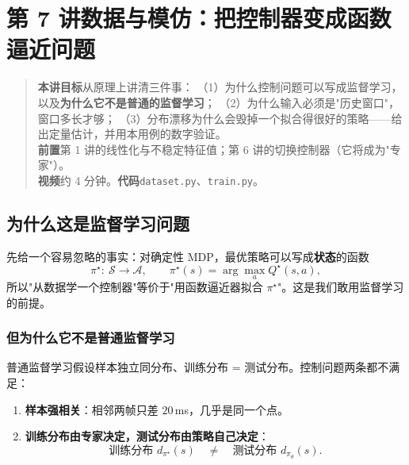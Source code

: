 \chapter[数据与模仿]{第 7 讲\quad 数据与模仿：把控制器变成函数逼近问题}
\label{ch:data}

\begin{quote}\small
\textbf{本讲目标}\quad 从原理上讲清三件事：
（1）为什么控制问题可以写成监督学习，以及\textbf{为什么它不是普通的监督学习}；
（2）为什么输入必须是"历史窗口"，窗口多长才够；
（3）分布漂移为什么会毁掉一个拟合得很好的策略——给出定量估计，并用本用例的数字验证。\\[2pt]
\textbf{前置}\quad 第 1 讲的线性化与不稳定特征值；第 6 讲的切换控制器（它将成为"专家"）。\\
\textbf{视频}\quad 约 4 分钟。\quad\textbf{代码}\quad \texttt{dataset.py}、\texttt{train.py}。
\end{quote}

\section{为什么这是监督学习问题}

先给一个容易忽略的事实：对确定性 MDP，最优策略可以写成\textbf{状态}的函数
\begin{equation}
  \pi^\star:\ \mathcal{S}\to\mathcal{A},\qquad
  \pi^\star(s)=\arg\max_a Q^\star(s,a),
\end{equation}
所以"从数据学一个控制器"等价于"用函数逼近器拟合 $\pi^\star$"。这是我们敢用监督学习的前提。

\subsection{但为什么它不是普通监督学习}

普通监督学习假设样本独立同分布、训练分布 = 测试分布。控制问题两条都不满足：

\begin{enumerate}[leftmargin=2em,itemsep=2pt]
  \item \textbf{样本强相关}：相邻两帧只差 $20$\,ms，几乎是同一个点。
  \item \textbf{训练分布由专家决定，测试分布由策略自己决定}：
        \begin{equation}
          \text{训练分布 } d_{\pi^\star}(s)\quad\ne\quad \text{测试分布 } d_{\pi_\theta}(s).
          \label{eq:dist}
        \end{equation}
\end{enumerate}

